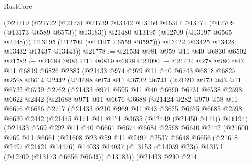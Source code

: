 \begin{lexlean}{RustCore}
\begin{coremodule}
          (@21719
            (@21722
              (@21731 @21739 @13142 @13150 @16317 @13171 (@12709 (@13173 @6589 @6573)) @13183))
            @21480
            @13195
            (@12709 (@13197 @6565 @2448)))
          @13195
          (@12709 (@13197 @6559 @6597)))
        @13422
        @13425
        @13428
        @13432
        @13437
        @13443))
@21778 := @21534 @981 @959 @11 @40 @6830 @6502
@21782 := @21688 @981 @11 @6819 @6828
@22090 := @21424
    @278
    @980
    @43
    @11
    @6819
    @6826
    @2883
    (@21433
      @974
      @979
      @11
      @40
      @6743
      @6818
      @6825
      @2598
      @6614
      @2442
      (@21688
        @974
        @11
        @6732
        @6741
        (@21693
          @973
          @43
          @11
          @6732
          @6739
          @2762
          (@21433
            @971
            @595
            @11
            @40
            @6690
            @6731
            @6738
            @2598
            @6622
            @2442
            (@21688
              @971
              @11
              @6676
              @6688
              (@21424
                @282
                @970
                @58
                @11
                @6676
                @6686
                @2717
                (@21433
                  @210
                  @969
                  @11
                  @43
                  @3635
                  @6675
                  @6685
                  @2598
                  @6630
                  @2442
                  (@21445 @171 @11 @171 @3635 (@12449 (@21450 @171)) @16194)
                  (@21433
                    @769
                    @292
                    @11
                    @40
                    @6661
                    @6674
                    @6684
                    @2598
                    @6640
                    @2442
                    (@21600
                      @769
                      @11
                      @6661
                      (@21608
                        @23
                        @59
                        @11
                        @2497
                        @2537
                        @6648
                        @6656
                        (@21618 @2497 @21621 @14476)
                        @14033
                        @14037
                        (@13153 (@14039 @23))
                        @13171
                        (@12709 (@13173 @6656 @6649))
                        @13183))
                    (@21433
                      @290
                      @214

\end{coremodule}
\end{lexlean}
